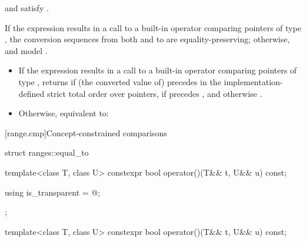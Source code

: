 \begin{itemdescr}
\pnum
\constraints
{} and  satisfy .

\pnum
\expects
If the expression  results in
a call to a built-in operator \tcode{<=>} comparing pointers of type ,
the conversion sequences from both  and  to 
are equality-preserving;
otherwise,  and  model .

\pnum
\effects
\begin{itemize}
\item
  If the expression  results in
  a call to a built-in operator \tcode{<=>} comparing pointers of type ,
  returns 
  if (the converted value of)  precedes 
  in the implementation-defined strict total order
  over pointers,
  if  precedes , and
  otherwise .
\item
  Otherwise, equivalent to: 
\end{itemize}
\end{itemdescr}

[range.cmp]{Concept-constrained comparisons}

%
\begin{codeblock}
struct ranges::equal_to {
  template<class T, class U>
    constexpr bool operator()(T&& t, U&& u) const;

  using is_transparent = @\unspecnc@;
};
\end{codeblock}

\begin{itemdecl}
template<class T, class U>
  constexpr bool operator()(T&& t, U&& u) const;
\end{itemdecl}

